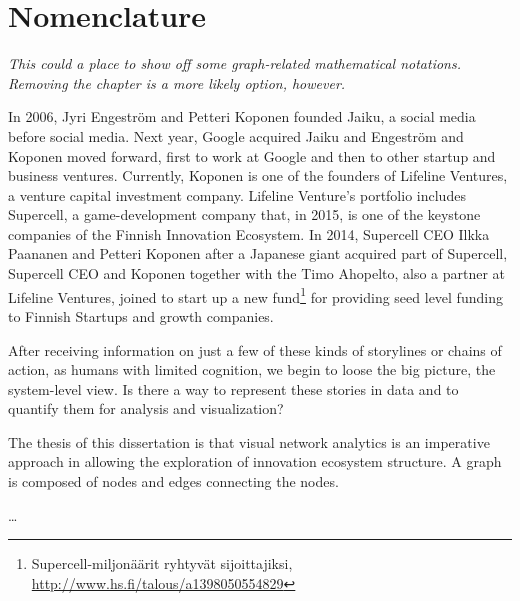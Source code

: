 

\chapter{Nomenclature}
\label{chapter:nomencl}

\emph{This could a place to show off some graph-related mathematical notations. Removing the chapter is a more likely option, however.}

In 2006, Jyri Engeström and Petteri Koponen founded Jaiku, a social media before social media. Next year, Google acquired Jaiku and Engeström and Koponen moved forward, first to work at Google and then to other startup and business ventures. Currently, Koponen is one of the founders of Lifeline Ventures, a venture capital investment company. Lifeline Venture's portfolio includes Supercell, a game-development company that, in 2015, is one of the keystone companies of the Finnish Innovation Ecosystem. In 2014, Supercell CEO Ilkka Paananen and Petteri Koponen after a Japanese giant acquired part of Supercell, Supercell CEO and Koponen together with the Timo Ahopelto, also a partner at Lifeline Ventures, joined to start up a new fund\footnote{Supercell-miljonäärit ryhtyvät sijoittajiksi, \url{http://www.hs.fi/talous/a1398050554829}} for providing seed level funding to Finnish Startups and growth companies.

After receiving information on just a few of these kinds of storylines or chains of action, as humans with limited cognition, we begin to loose the big picture, the system-level view. Is there a way to represent these stories in data and to quantify them for analysis and visualization?

The thesis of this dissertation is that visual network analytics is an imperative approach in allowing the exploration of innovation ecosystem structure. A graph is composed of nodes and edges connecting the nodes.

… 



